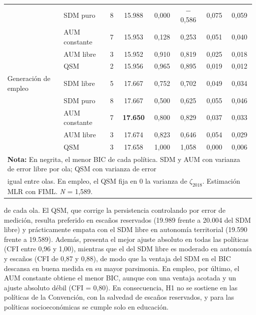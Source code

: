 \documentclass{article}
\begin{document}
\begin{table}[ht!]
{\begin{tabular}{llcccccc}
                      & SDM puro      & 8 & 15.988 & 0{,}000 & $-$0{,}586 & 0{,}075 & 0{,}059 \\
                      & AUM constante & 7 & 15.953 & 0{,}128 & 0{,}253 & 0{,}051 & 0{,}040 \\
                      & AUM libre     & 3 & 15.952 & 0{,}910 & 0{,}819 & 0{,}025 & 0{,}018 \\
                      & QSM           & 2 & 15.956 & 0{,}965 & 0{,}895 & 0{,}019 & 0{,}012 \\
\midrule
Generación de empleo  & SDM libre     & 5 & 17.667 & 0{,}752 & 0{,}702 & 0{,}049 & 0{,}034 \\
                      & SDM puro      & 8 & 17.667 & 0{,}500 & 0{,}625 & 0{,}055 & 0{,}046 \\
                      & AUM constante & 7 & \textbf{17.650} & 0{,}800 & 0{,}829 & 0{,}037 & 0{,}033 \\
                      & AUM libre     & 3 & 17.674 & 0{,}823 & 0{,}646 & 0{,}054 & 0{,}029 \\
                      & QSM           & 3 & 17.658 & 1{,}000 & 1{,}058 & 0{,}000 & 0{,}006 \\
\bottomrule
\multicolumn{8}{l}{\rule{0pt}{1em}\footnotesize\textbf{Nota:} En negrita, el menor BIC de cada política. SDM y AUM con varianza de error libre por ola; QSM con varianza de error} \\
\multicolumn{8}{l}{\footnotesize igual entre olas. En empleo, el QSM fija en 0 la varianza de $\zeta_{2018}$. Estimación MLR con FIML. \textit{N} = 1,589.} \\
\end{tabular}
}
\end{table}

de cada ola. El QSM, que corrige la persistencia controlando por error de medición, resulta preferido en escaños reservados (19.989 frente a 20.004 del SDM libre) y prácticamente empata con el SDM libre en autonomía territorial (19.590 frente a 19.589). Además, presenta el mejor ajuste absoluto en todas las políticas (CFI entre 0,96 y 1,00), mientras que el del SDM libre es moderado en autonomía y escaños (CFI de 0,87 y 0,88), de modo que la ventaja del SDM en el BIC descansa en buena medida en su mayor parsimonia. En empleo, por último, el AUM constante obtiene el menor BIC, aunque con una ventaja acotada y un ajuste absoluto débil (CFI = 0,80). En consecuencia, H1 no se sostiene en las políticas de la Convención, con la salvedad de escaños reservados, y para las políticas  socioeconómicas se cumple solo en educación.
\end{document}
